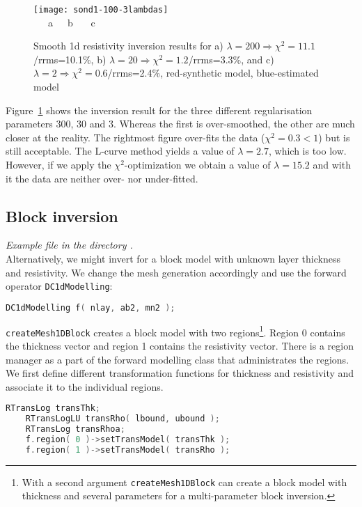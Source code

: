 \begin{figure}[htbp]
\texttt{[image: sond1-100-3lambdas]}\\[-3ex]
~~~a\hfill ~~~b \hfill ~~~c \hfill ~
\caption{Smooth 1d resistivity inversion results for a) $\lambda=200\Rightarrow \chi^2=11.1$/rrms=10.1\%, b) $\lambda=20\Rightarrow \chi^2=1.2$/rrms=3.3\%, and c) $\lambda=2\Rightarrow \chi^2=0.6$/rrms=2.4\%, red-synthetic model, blue-estimated model}\label{fig:dc1d-3lambda}
\end{figure}

Figure~\ref{fig:dc1d-3lambda} shows the inversion result for the three different regularisation parameters 300, 30 and 3.
Whereas the first is over-smoothed, the other are much closer at the reality.
The rightmost figure over-fits the data ($\chi^2=0.3<1$) but is still acceptable.
The L-curve method yields a value of $\lambda=2.7$, which is too low.
However, if we apply the $\chi^2$-optimization we obtain a value of $\lambda=15.2$ and with it the data are neither over- nor under-fitted.

\subsection{Block inversion}\label{sec:dc1dblock}
{\em Example file  in the directory .}\\
Alternatively, we might invert for a block model with unknown layer thickness and resistivity.
We change the mesh generation accordingly and use the forward operator \lstinline|DC1dModelling|:
\begin{lstlisting}[language=C++]
    DC1dModelling f( nlay, ab2, mn2 );
\end{lstlisting}

\lstinline|createMesh1DBlock| creates a block model with two regions\footnote{With a second argument \lstinline|createMesh1DBlock| can create a block model with thickness and several parameters for a multi-parameter block inversion.}.
Region 0 contains the thickness vector and region 1 contains the resistivity vector.
There is a region manager as a part of the forward modelling class that administrates the regions.
We first define different transformation functions for thickness and resistivity and associate it to the individual regions.
\begin{lstlisting}[language=C++]
    RTransLog transThk;
    RTransLogLU transRho( lbound, ubound );
    RTransLog transRhoa;
    f.region( 0 )->setTransModel( transThk );
    f.region( 1 )->setTransModel( transRho );
\end{lstlisting}


